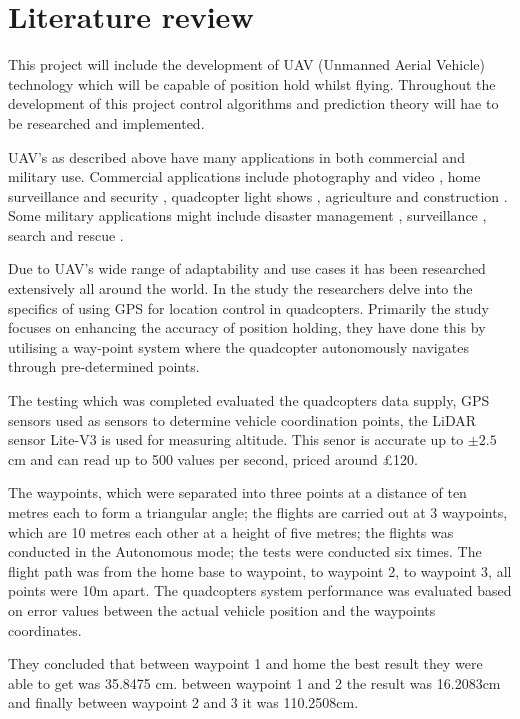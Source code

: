 \documentclass{report}
\begin{document}
\section{Literature review}
This project will include the development of UAV (Unmanned Aerial
Vehicle) technology which will be capable of position hold whilst flying.
Throughout the development of this project control algorithms and prediction theory will hae to be researched and implemented.

UAV's as described above have many applications in both commercial and military
use. Commercial applications include photography and video
\cite{photographyAndVideo}, home surveillance and security \cite{security},
quadcopter light shows \cite{lightShow}, agriculture \cite{agricultural} and
construction \cite{construction}. Some military applications might include
disaster management \cite{disasterManagement}, surveillance \cite{surveillance},
search and rescue \cite{searchAndRescue}.

Due to UAV's wide range of adaptability and use cases it has been researched
extensively all around the world. In the study \cite{Widhianto2023Quadcopter}
the researchers delve into the specifics of using GPS for location control in
quadcopters. Primarily the study focuses on enhancing the accuracy of position
holding, they have done this by utilising a way-point system where the
quadcopter autonomously navigates through pre-determined points.

The testing which was completed evaluated the quadcopters data supply, GPS
sensors used as sensors to determine vehicle coordination points, the LiDAR
sensor Lite-V3 is used for measuring altitude. This senor is accurate up to \(\pm 2.5\)cm and can read up to 500 values per second, priced around £120.

The waypoints, which were separated into three points at a distance of ten
metres each to form a triangular angle; the flights are carried out at 3
waypoints, which are 10 metres each other at a height of five metres; the
flights was conducted in the Autonomous mode; the tests were conducted six
times. The flight path was from the home base to waypoint, to waypoint 2, to
waypoint 3, all points were 10m apart. The quadcopters system performance was
evaluated based on error values between the actual vehicle position and the
waypoints coordinates.

They concluded that between waypoint 1 and home the best result they were able
to get was 35.8475 cm. between waypoint 1 and 2 the result was 16.2083cm and
finally between waypoint 2 and 3 it was 110.2508cm.
\end{document}

